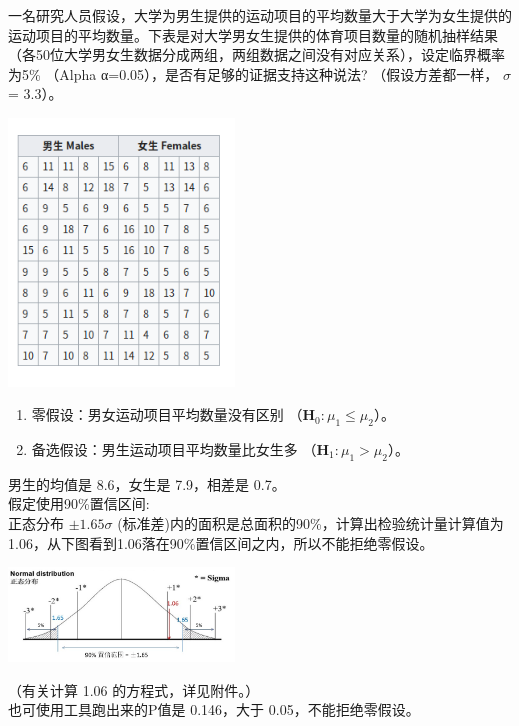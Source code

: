 一名研究人员假设，大学为男生提供的运动项目的平均数量大于大学为女生提供的运动项目的平均数量。下表是对大学男女生提供的体育项目数量的随机抽样结果（各50位大学男女生数据分成两组，两组数据之间没有对应关系），设定临界概率为5\%
（Alpha α=0.05），是否有足够的证据支持这种说法? （假设方差都一样，
\(\sigma\) = 3.3）。


\includegraphics[width=6cm]{Screenshotfrom2023-11-1003-40-34.png}

\begin{enumerate}
\tightlist
\item
  零假设：男女运动项目平均数量没有区别
  （\(\mathbf{H}_0: {\mu}_1 \le  {\mu}_2\)）。
\item
  备选假设：男生运动项目平均数量比女生多
  （\(\mathbf{H}_1: {\mu}_1 > {\mu}_2\)）。
\end{enumerate}

男生的均值是 8.6，女生是 7.9，相差是 0.7。\\
假定使用90\%置信区间:\\
正态分布 \(\pm 1.65{\sigma}\)
(标准差)内的面积是总面积的90\%，计算出检验统计量计算值为1.06，从下图看到1.06落在90\%置信区间之内，所以不能拒绝零假设。


\includegraphics[width=6cm]{M4twoPopulationScreenshot_2022-09-11_201946.jpg}

（有关计算 1.06 的方程式，详见附件。）\\
也可使用工具跑出来的P值是 0.146，大于 0.05，不能拒绝零假设。

